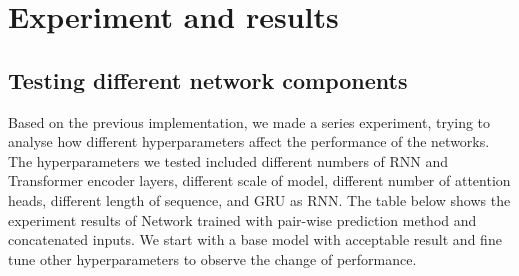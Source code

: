 \chapter{Experiment and results}

\section{Testing different network components}
Based on the previous implementation, we made a series experiment, trying to analyse how different hyperparameters affect the performance of the networks. The hyperparameters we tested included different numbers of RNN and Transformer encoder layers, different scale of model, different number of attention heads, different length of sequence, and GRU as RNN. The table below shows the experiment results of Network trained with pair-wise prediction method and concatenated inputs. We start with a base model with acceptable result and fine tune other hyperparameters to observe the change of performance. 

